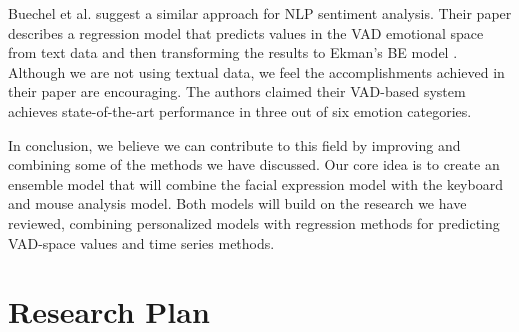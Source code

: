 \documentclass{article}
\begin{document}
Buechel et al. \cite{emotion_regression} suggest a similar approach for NLP sentiment analysis. 
Their paper describes a regression model that predicts values in the VAD emotional 
space \cite{VAD_model} from text data and then transforming the results to Ekman's BE model \cite{Ekman_Theory}. 
Although we are not using textual data, we feel the accomplishments achieved in their 
paper are encouraging. The authors claimed their VAD-based system achieves state-of-the-art 
performance in three out of six emotion categories.
\par

In conclusion, we believe we can contribute to this field by improving and combining some of the 
methods we have discussed. Our core idea is to create an ensemble model that will combine the 
facial expression model with the keyboard and mouse analysis model. 
Both models will build on the research we have reviewed, combining personalized models with 
regression methods for predicting VAD-space values and time series methods.

\section{Research Plan}



%  

\end{document}
